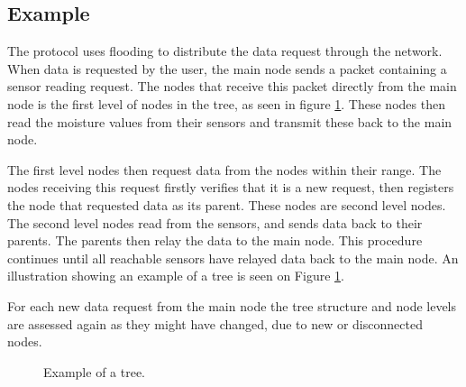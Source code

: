 

\subsection*{Example}
The protocol uses flooding to distribute the data request through the network. 
When data is requested by the user, the main node sends a packet containing a sensor reading request. 
The nodes that receive this packet directly from the main node is the first level of nodes in the tree, as seen in figure \ref{fig:prottree1}. 
These nodes then read the moisture values from their sensors and transmit these back to the main node. 

The first level nodes then request data from the nodes within their range. 
The nodes receiving this request firstly verifies that it is a new request, then registers the node that requested data as its parent. 
These nodes are second level nodes. The second level nodes read from the sensors, and sends data back to their parents. The parents then relay the data to the main node. 
This procedure continues until all reachable sensors have relayed data back to the main node.
An illustration showing an example of a tree is seen on Figure \ref{fig:prottree1}.

For each new data request from the main node the tree structure and node levels are assessed again as they might have changed, due to new or disconnected nodes.

\begin{figure}[!h]
	\centering
	\caption{Example of a tree.}
	\label{fig:prottree1}
\end{figure}

